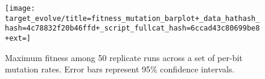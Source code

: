 \begin{figure*}
\begin{minipage}{6in}
\begin{center}

\texttt{[image: target\_evolve/title=fitness\_mutation\_barplot+\_data\_hathash\_hash=4c78832f20b46ffd+\_script\_fullcat\_hash=6ccad43c80699be8+ext=]}
\caption{
Maximum fitness among 50 replicate runs across a set of per-bit mutation rates.
Error bars represent 95\% confidence intervals.
}
\label{fig:evolve_mutsweep}

\end{center}
\end{minipage}
\end{figure*}
